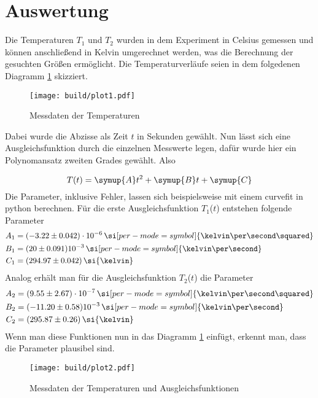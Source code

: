 \section{Auswertung}
Die Temperaturen $T_{1}$ und $T_{2}$ wurden in dem Experiment in Celsius gemessen und können anschließend in Kelvin umgerechnet werden, was die Berechnung
der gesuchten Größen ermöglicht. Die Temperaturverläufe seien in dem folgedenen Diagramm \ref{fig:plot1} skizziert.
\begin{figure}[h]
  \centering
  \texttt{[image: build/plot1.pdf]}
  \caption{Messdaten der Temperaturen}
  \label{fig:plot1}
\end{figure}
\begin{flushleft}
Dabei wurde die Abzisse als Zeit $t$ in Sekunden gewählt. Nun lässt sich eine Ausgleichsfunktion durch
die einzelnen Messwerte legen, dafür wurde hier ein Polynomansatz zweiten Grades gewählt. Also
\end{flushleft}
\begin{equation}
T(t) = \symup{A} t^{2} + \symup{B} t + \symup{C}
\end{equation}
Die Parameter, inklusive Fehler, lassen sich beispielsweise mit einem curvefit in python berechnen.
Für die erste Ausgleichsfunktion $T_{1}$($t$) entstehen folgende Parameter
\begin{align}
A_{1} &= (-3.22 \pm 0.042)\cdot 10^{-6} \, \si[per-mode=symbol]{\kelvin\per\second\squared}\\
B_{1} &= (20 \pm 0.091) 10^{-3} \,\si[per-mode=symbol]{\kelvin\per\second}\\
C_{1} &= (294.97 \pm 0.042) \,\si{\kelvin}
\end{align}
Analog erhält man für die Ausgleichsfunktion $T_{2}$($t$) die Parameter
\begin{align}
A_{2} &= (9.55 \pm 2.67)\cdot 10^{-7} \, \si[per-mode=symbol]{\kelvin\per\second\squared}\\
B_{2} &= (-11.20 \pm 0.58) 10^{-3} \,\si[per-mode=symbol]{\kelvin\per\second}\\
C_{2} &= (295.87 \pm 0.26) \,\si{\kelvin}
\end{align}
Wenn man diese Funktionen nun in das Diagramm \ref{fig:plot1} einfügt, erkennt man,
dass die Parameter plausibel sind.
\begin{figure}[h]
  \centering
  \texttt{[image: build/plot2.pdf]}
  \caption{Messdaten der Temperaturen und Ausgleichsfunktionen}
  \label{fig:plot2}
\end{figure}